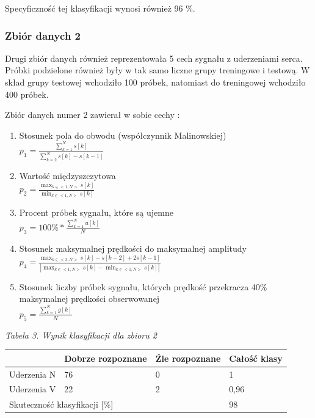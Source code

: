 \documentclass[11pt]{article}
\begin{document}
\begin{enumerate}
\noindent Specyficzność tej klasyfikacji wynosi również 96 \%. 

\subsubsection{Zbiór danych 2} 

\noindent Drugi zbiór danych również reprezentowała 5 cech sygnału z uderzeniami serca. Próbki podzielone również były w tak samo liczne grupy treningowe i testową. W skład grupy testowej wchodziło 100 próbek, natomiast do treningowej wchodziło 400 próbek.

\noindent Zbiór danych numer 2 zawierał w sobie cechy :

\begin{enumerate}
\item  Stosunek pola do obwodu (współczynnik Malinowskiej) 
 \\$p_1 = \frac{\sum_{k=1}^{N} s[k]}{\sum_{k=2}^{N} s[k]-s[k-1]}$

\item  Wartość międzyszczytowa
\\$p_2 = \frac{\max_{k \in <1,N>} s[k]}{\min_{k \in <1,N>} s[k]}$

\item  Procent próbek sygnału, które są ujemne    \\$p_3 = 100\% * \frac{\sum_{k=1}^{N} u[k]}{N}$ 

\item  Stosunek maksymalnej prędkości do maksymalnej amplitudy 
\\$p_4 = \frac{\max_{k \in <3,N>} s[k]-s[k-2]+2s[k-1]}{|\max_{k \in <1,N>} s[k] - \min_{k \in <1,N>} s[k]|}$

\item  Stosunek liczby próbek sygnału, których prędkość przekracza 40\% maksymalnej prędkości obserwowanej 
\\$p_5 = \frac{\sum_{k=1}^{N} g[k]}{N}$

\end{enumerate}
\textit{Tabela 3. Wynik klasyfikacji dla zbioru 2}
\newline
\begin{tabular}{|p{1.2in}|p{1.0in}|p{1.0in}|p{1.0in}|} \hline 
 & Dobrze rozpoznane & \'{Z}le rozpoznane & Całość klasy  \\ \hline 
Uderzenia N & 76 & 0 & 1 \\ \hline 
Uderzenia V & 22 & 2 & 0,96 \\ \hline 
\multicolumn{3}{|p{1in}|}{Skuteczność klasyfikacji [\%] } & 98 \\ \hline 
\end{tabular}




\end{enumerate}
\end{document}
